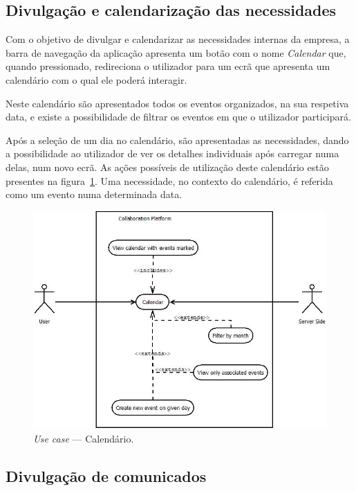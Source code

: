 \newpage

\subsection{Divulgação e calendarização das necessidades}

Com o objetivo de divulgar e calendarizar as necessidades internas da empresa, a barra de navegação da aplicação apresenta um botão com o nome \textit{Calendar} que, quando pressionado, 
redireciona o utilizador para um ecrã que apresenta um calendário com o qual ele poderá interagir. 
\par
Neste calendário são apresentados todos os eventos organizados, na sua respetiva data, e existe a possibilidade de filtrar os eventos em que o utilizador participará. 
\par
Após a seleção de um dia no calendário, são apresentadas as necessidades, dando a possibilidade ao utilizador de ver os detalhes individuais após carregar numa delas, 
num novo ecrã.
As ações possíveis de utilização deste calendário estão presentes na figura~\ref{fig:uc:calendar}. 
Uma necessidade, no contexto do calendário, é referida como um evento numa determinada data. 

\begin{figure}[H]
    \centering
    \includegraphics[scale=0.6]{figures/Calendar use case.jpeg}
    \caption{\textit{Use case} --- Calendário.}\label{fig:uc:calendar}
\end{figure}


\newpage

\subsection{Divulgação de comunicados}

